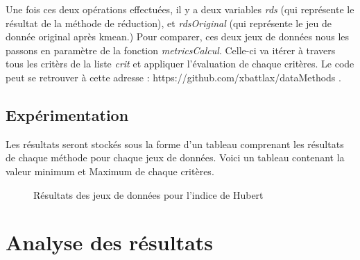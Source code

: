 Une fois ces deux opérations effectuées, il y a deux variables \textit{rds} (qui représente le résultat de la méthode de réduction), et \textit{rdsOriginal} (qui représente le jeu de
donnée original après kmean.) Pour comparer, ces deux jeux de données nous les passons en paramètre de la fonction \textit{metricsCalcul}.
Celle-ci va itérer à travers tous les critèrs de la liste \textit{crit} et appliquer l'évaluation de chaque critères.
Le code peut se retrouver à cette adresse : https://github.com/xbattlax/dataMethods . 
\subsection{Expérimentation}
Les résultats seront stockés sous la forme d'un tableau comprenant les résultats de chaque méthode pour chaque jeux de données. 
Voici un tableau contenant la valeur minimum et Maximum de chaque critères.

\begin{center}
    \begin{figure}[!ht] 
        \caption{Résultats des jeux de données pour l'indice de Hubert}
    \end{figure}

\end{center}


\section{Analyse des résultats}

